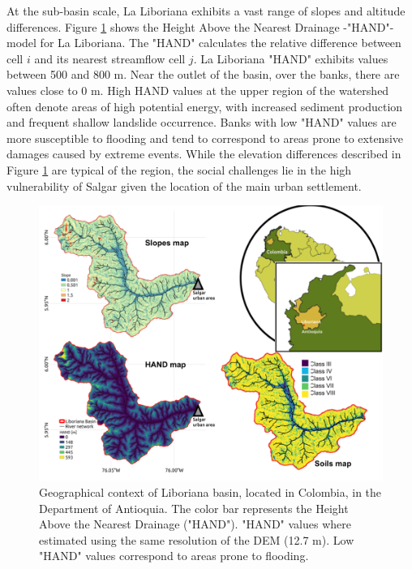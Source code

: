 \documentclass[hess, manuscript]{copernicus}
\begin{document}

At the sub-basin scale, La Liboriana exhibits a vast range of slopes and altitude differences.  Figure \ref{fig:Ubicacion} shows the Height Above the Nearest Drainage -"HAND"- model   \citep{Renno2008} for La Liboriana. The "HAND" calculates the relative difference between cell $i$ and its nearest streamflow cell $j$.  La Liboriana "HAND" exhibits values between 500 and 800 $\text{m}$. Near the outlet of the basin, over the banks, there are values close to 0 m.  High HAND values at the upper region of the watershed often denote areas of high potential energy, with increased sediment production and frequent shallow landslide occurrence.  Banks with low "HAND" values are more susceptible to flooding and tend to correspond to areas prone to extensive damages caused by extreme events.  While the elevation differences described in Figure \ref{fig:Ubicacion} are typical of the region, the social challenges lie in the high vulnerability of Salgar given the location of the main urban settlement.\\ 

\begin{figure}[t]
\centering
    \includegraphics[width=12cm]{Figures/UbicacionV2.png}
    \caption{Geographical context of Liboriana basin,  located in Colombia, in the Department of Antioquia.  The color bar represents the Height Above the Nearest Drainage ("HAND").  "HAND" values where estimated using the same resolution of the DEM (12.7 $\text{m}$).  Low "HAND" values correspond to areas prone to flooding.}
    \label{fig:Ubicacion}
\end{figure}
\end{document}
